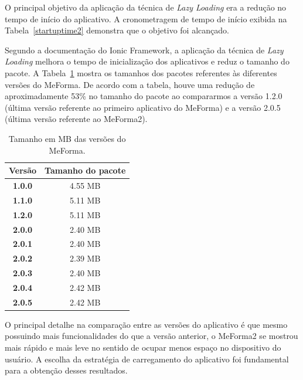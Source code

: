O principal objetivo da aplicação da técnica de \textit{Lazy Loading} era a redução no tempo de início do aplicativo. A cronometragem de tempo de início exibida na Tabela~\ref{startuptime2} demonstra que o objetivo foi alcançado.

Segundo a documentação do Ionic Framework, a aplicação da técnica de \textit{Lazy Loading} melhora o tempo de inicialização dos aplicativos e reduz o tamanho do pacote. A Tabela~\ref{appsize} mostra os tamanhos dos pacotes referentes às diferentes versões do MeForma. De acordo com a tabela, houve uma redução de aproximadamente 53\% no tamanho do pacote ao compararmos a versão 1.2.0 (última versão referente ao primeiro aplicativo do MeForma) e a versão 2.0.5 (última versão referente ao MeForma2).


\begin{table}[H]
\begin{center}
\caption{Tamanho em MB das versões do MeForma.}
\begin{tabular}{ |c|c| }
\hline
 \textbf{Versão} & \textbf{Tamanho do pacote} \\ 
 \hline
 \textbf{1.0.0} & {4.55 MB} \\
 \hline 
 \textbf{1.1.0} & {5.11 MB} \\
 \hline 
 \textbf{1.2.0} & {5.11 MB} \\
 \hline 
 \textbf{2.0.0} & {2.40 MB} \\
 \hline 
 \textbf{2.0.1} & {2.40 MB} \\
 \hline 
 \textbf{2.0.2} & {2.39 MB} \\
 \hline 
 \textbf{2.0.3} & {2.40 MB} \\
 \hline 
 \textbf{2.0.4} & {2.42 MB} \\
 \hline 
 \textbf{2.0.5} & {2.42 MB} \\
 \hline 
\end{tabular}
\end{center}
\label{appsize}

\end{table}

O principal detalhe na comparação entre as versões do aplicativo é que mesmo possuindo mais funcionalidades do que a versão anterior, o MeForma2 se mostrou mais rápido e mais leve no sentido de ocupar menos espaço no dispositivo do usuário. A escolha da estratégia de carregamento do aplicativo foi fundamental para a obtenção desses resultados.


 
 